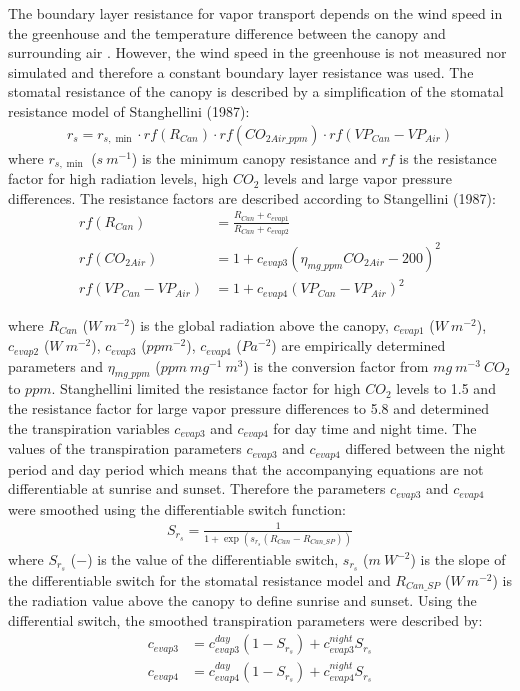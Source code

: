 \documentclass[a4paper]{article}
\numberwithin{equation}{section}
\begin{document}
The boundary layer resistance for vapor transport depends on the wind speed in the greenhouse and the temperature difference between the canopy and surrounding air \cite{stanghellini1987transpiration}.
However, the wind speed in the greenhouse is not measured nor simulated and therefore a constant boundary layer resistance was used.
The stomatal resistance of the canopy is described by a simplification of the stomatal resistance model of Stanghellini (1987):
\begin{align}
  r_s = r_{s,\min} \cdot rf(R_{Can}) \cdot rf(CO_{2Air\_ppm}) \cdot rf(VP_{Can} - VP_{Air})
\end{align}
where \(r_{s,\min}\) (\(s\ m^{-1}\)) is the minimum canopy resistance and \(rf\) is the resistance factor for high radiation levels, high \(CO_2\) levels and large vapor pressure differences.
The resistance factors are described according to Stangellini (1987):
\begin{equation}
  \begin{split}
    rf(R_{Can}) & = \frac{R_{Can} + c_{evap1}}{R_{Can} + c_{evap2}} \\
    rf(CO_{2Air}) & = 1 + {c_{evap3} (\eta_{mg\_ppm} CO_{2Air} - 200)}^2 \\
    rf(VP_{Can} - VP_{Air}) & = 1 + {c_{evap4} (VP_{Can} - VP_{Air})}^2
  \end{split}
\end{equation}

where \(R_{Can}\) (\(W\ m^{-2}\)) is the global radiation above the canopy, \(c_{evap1}\) (\(W\ m^{-2}\)), \(c_{evap2}\) (\(W\ m^{-2}\)), \(c_{evap3}\) (\(ppm^{-2}\)), \(c_{evap4}\) (\(Pa^{-2}\)) are empirically determined parameters and \(\eta_{mg\_ppm}\) (\(ppm\ mg^{-1}\ m^3\)) is the conversion factor from \(mg\ m^{-3}\ CO_2\) to \(ppm\).
Stanghellini limited the resistance factor for high \(CO_2\) levels to 1.5 and the resistance factor for large vapor pressure differences to 5.8 and determined the transpiration variables \(c_{evap3}\) and \(c_{evap4}\) for day time and night time.
The values of the transpiration parameters \(c_{evap3}\) and \(c_{evap4}\) differed between the night period and day period which means that the accompanying equations are not differentiable at sunrise and sunset. Therefore the parameters \(c_{evap3}\) and \(c_{evap4}\) were smoothed using the differentiable switch function:
\begin{align}
  S_{r_s} = \frac{1}{1 + \exp \left(s_{r_s} (R_{Can} - R_{Can\_SP})\right)}
\end{align}
where \(S_{r_s}\) (\(-\)) is the value of the differentiable switch, \(s_{r_s}\) (\(m\ W^{-2}\)) is the slope of the differentiable switch for the stomatal resistance model and \(R_{Can\_SP}\) (\(W\ m^{-2}\)) is the radiation value above the canopy to define sunrise and sunset.
Using the differential switch, the smoothed transpiration parameters were described by:
\begin{align}
  c_{evap3} & = c_{evap3}^{day} (1 - S_{r_s}) + c_{evap3}^{night} S_{r_s} \\
  c_{evap4} & = c_{evap4}^{day} (1 - S_{r_s}) + c_{evap4}^{night} S_{r_s}
\end{align}
\end{document}
